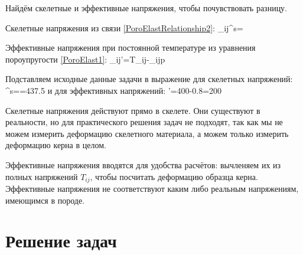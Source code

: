 \documentclass[main.tex]{subfiles}
\begin{document}
Найдём скелетные и эффективные напряжения, чтобы почувствовать разницу.

Скелетные напряжения из связи \eqref{PoroElastRelationship2}:
\beq
\sigma_{ij}^s=
\eeq

Эффективные напряжения при постоянной температуре из уравнения пороупругости \eqref{PoroElast1}:
\beq
\sigma_{ij}'=T_{ij}-\alpha_{ij}p
\eeq

Подставляем исходные данные задачи в выражение для скелетных напряжений:
\beq
\sigma^s==437.5
\eeq
и для эффективных напряжений:
\beq
\sigma'=400-0.8=200
\eeq

Скелетные напряжения действуют прямо в скелете. Они существуют в реальности, но для практического решения задач не подходят, так как мы не можем измерить деформацию скелетного материала, а можем только измерить деформацию керна в целом.

Эффективные напряжения вводятся для удобства расчётов: вычленяем их из полных напряжений $T_{ij}$, чтобы посчитать деформацию образца керна. Эффективные напряжения не соответствуют каким либо реальным напряжениям, имеющимся в породе.

\section{Решение задач}
\end{document}
